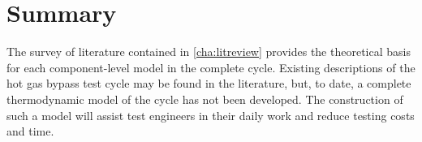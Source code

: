\section{Summary}
The survey of literature contained in \cref{cha:litreview} provides
the theoretical basis for each component-level model in the complete cycle.
Existing descriptions of the hot gas bypass test cycle may be found in the
literature, but, to date, a complete thermodynamic model of the cycle has
not been developed.
The construction of such a model will assist test engineers in their daily
work and reduce testing costs and time.